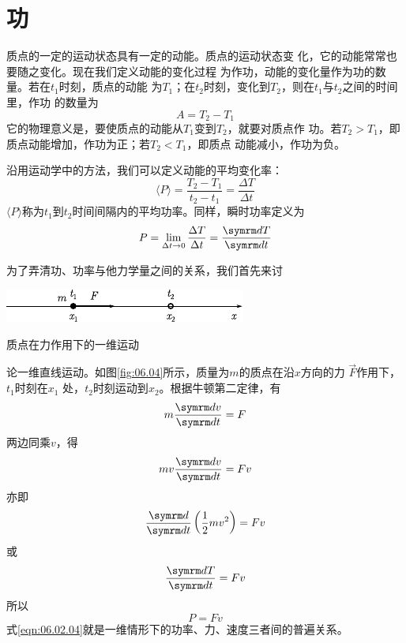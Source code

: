 \section{功}\label{sec:06.02}

质点的一定的运动状态具有一定的动能。质点的运动状态变
化，它的动能常常也要随之变化。现在我们定义动能的变化过程
为作功，动能的变化量作为功的数量。若在$ t_1 $时刻，质点的动能
为$ T _ { 1 } $；在$ t_2 $时刻，变化到$ T_2 $，则在$ t _ { 1 } $与$ t _ { 2 } $之间的时间里，作功
的数量为
\begin{equation}\label{eqn:06.02.01}
 A = T _ { 2 } - T _ { 1 }
\end{equation}
它的物理意义是，要使质点的动能从$ T_1 $变到$ T_2 $，就要对质点作
功。若$ T _ { 2 } > T _ { 1 } $，即质点动能增加，作功为正；若$ T _ { 2 } < T _ { 1 } $，即质点
动能减小，作功为负。

沿用运动学中的方法，我们可以定义动能的平均变化率：
\begin{equation}\label{eqn:06.02.02}
 \langle P \rangle = \frac { T _ { 2 } - T _ { 1 } } { t _ { 2 } - t _ { 1 } } = \frac { \Delta T } { \Delta t }
\end{equation}
$ \langle P \rangle $称为$ t _ { 1 } $到$ t _ { 2 } $时间间隔内的平均功率。同样，瞬时功率定义为
\begin{equation}\label{eqn:06.02.03}
 P = \lim _ { \Delta t \to 0 } \frac { \Delta T } { \Delta t } = \frac { \dif T } { \dif t }
\end{equation}

为了弄清功、功率与他力学量之间的关系，我们首先来讨
\begin{figurex}
    \centering
    \includegraphics{figure/fig06.04}
    \caption{质点在力作用下的一维运动}
    \label{fig:06.04}
\end{figurex}
论一维直线运动。如图\ref{fig:06.04}\;所示，质量为$ m $的质点在沿$ x $方向的力
$ \vec{F} $作用下，$ t _ { 1 } $时刻在$ x _ { 1 } $ 处，$ t _ { 2 } $时刻运动到$ x _ 2 $。根据牛顿第二定律，有
\begin{equation*}
 m \frac { \dif v } { \dif t } = F
\end{equation*}
两边同乘$ v $，得
\begin{equation*}
 m v \frac { \dif v } { \dif t } = F v
\end{equation*}
亦即
\begin{equation*}
 \frac { \dif } { \dif t } \left( \frac { 1 } { 2 } m v ^ { 2 } \right) = F v
\end{equation*}
或
\begin{equation*}
 \frac { \dif T } { \dif t } = F v
\end{equation*}
所以
\begin{equation}\label{eqn:06.02.04}
 P = F v
\end{equation}
式\eqref{eqn:06.02.04}就是一维情形下的功率、力、速度三者间的普遍关系。

